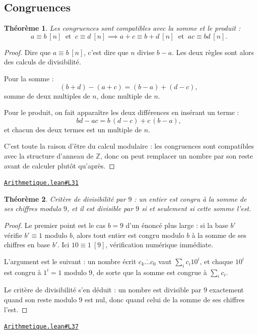 \documentclass[11pt,a4paper]{article}
\theoremstyle{definition}
\theoremstyle{plain}
\newtheorem{theoreme}{Théorème}
\newcommand{\source}[2]{\par\smallskip\noindent\hfill{\footnotesize\href{#1}{\texttt{#2}}}\par\smallskip}
\begin{document}
\subsection{Congruences}

\begin{theoreme}
Les congruences sont compatibles avec la somme et le produit :
\[ a \equiv b \ [n] \ \text{ et } \ c \equiv d \ [n]
   \implies a + c \equiv b + d \ [n] \ \text{ et } \ ac \equiv bd \ [n] . \]
\end{theoreme}

\begin{proof}
Dire que $a \equiv b \ [n]$, c'est dire que $n$ divise $b - a$. Les deux règles sont alors
des calculs de divisibilité.

Pour la somme :
\[ (b + d) - (a + c) = (b - a) + (d - c) , \]
somme de deux multiples de $n$, donc multiple de $n$.

Pour le produit, on fait apparaître les deux différences en insérant un terme :
\[ bd - ac = b\,(d - c) + c\,(b - a) , \]
et chacun des deux termes est un multiple de $n$.

C'est toute la raison d'être du calcul modulaire : les congruences sont compatibles avec la
structure d'anneau de $\mathbb{Z}$, donc on peut remplacer un nombre par son reste avant de
calculer plutôt qu'après.
\end{proof}
\source{https://github.com/Commutator-IO/learn-lean/blob/main/courses/02-lycee/10-specialite-mathematiques-terminale-s/Arithmetique.lean\#L31}{Arithmetique.lean\#L31}

\begin{theoreme}
Critère de divisibilité par $9$ : un entier est congru à la somme de ses chiffres
modulo $9$, et il est divisible par $9$ si et seulement si cette somme l'est.
\end{theoreme}

\begin{proof}
Le premier point est le cas $b = 9$ d'un énoncé plus large : si la base $b'$ vérifie
$b' \equiv 1$ modulo $b$, alors tout entier est congru modulo $b$ à la somme de ses chiffres
en base $b'$. Ici $10 \equiv 1 \ [9]$, vérification numérique immédiate.

L'argument est le suivant : un nombre écrit $\overline{c_k \dots c_0}$ vaut
$\sum_i c_i 10^{i}$, et chaque $10^{i}$ est congru à $1^{i} = 1$ modulo $9$, de sorte que
la somme est congrue à $\sum_i c_i$.

Le critère de divisibilité s'en déduit : un nombre est divisible par $9$ exactement quand
son reste modulo $9$ est nul, donc quand celui de la somme de ses chiffres l'est.
\end{proof}
\source{https://github.com/Commutator-IO/learn-lean/blob/main/courses/02-lycee/10-specialite-mathematiques-terminale-s/Arithmetique.lean\#L37}{Arithmetique.lean\#L37}
\end{document}
